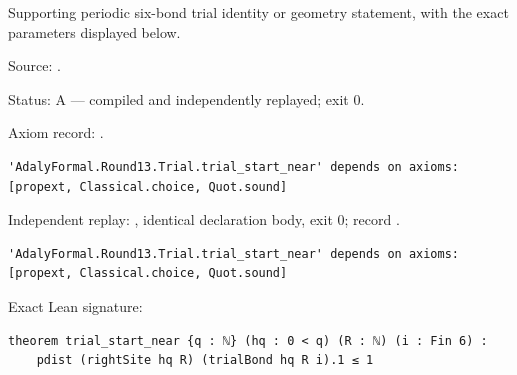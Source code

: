 \begin{theorem}[bp-362]
\label{bp-362}
\leanok
Supporting periodic six-bond trial identity or geometry statement, with the exact parameters displayed below.

\par Source: \texttt{}.
\par Status: A — compiled and independently replayed; exit 0.
\par Axiom record: \texttt{}.
\begin{verbatim}
'AdalyFormal.Round13.Trial.trial_start_near' depends on axioms: [propext, Classical.choice, Quot.sound]
\end{verbatim}
\par Independent replay: \texttt{}, identical declaration body, exit 0; record \texttt{}.
\begin{verbatim}
'AdalyFormal.Round13.Trial.trial_start_near' depends on axioms: [propext, Classical.choice, Quot.sound]
\end{verbatim}
\par Exact Lean signature:
\begin{verbatim}
theorem trial_start_near {q : ℕ} (hq : 0 < q) (R : ℕ) (i : Fin 6) :
    pdist (rightSite hq R) (trialBond hq R i).1 ≤ 1
\end{verbatim}
\end{theorem}

